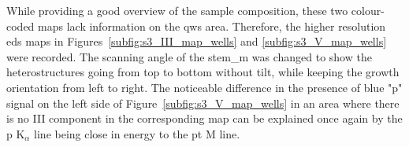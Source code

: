 While providing a good overview of the sample composition, these two colour-coded maps lack information on the \acl{qw}s area. Therefore, the higher resolution \acs{eds} maps in Figures~\ref{subfig:s3_III_map_wells} and \ref{subfig:s3_V_map_wells} were recorded. The scanning angle of the \acs{stem_m} was changed to show the heterostructures going from top to bottom without tilt, while keeping the growth orientation from left to right. The noticeable difference in the presence of blue "\acl{p}" signal on the left side of Figure~\ref{subfig:s3_V_map_wells} in an area where there is no III component in the corresponding map can be explained once again by the \acl{p} K\(_\alpha\) line being close in energy to the \acl{pt} M line. 

\begin{figure}
    \centering
\end{figure}
